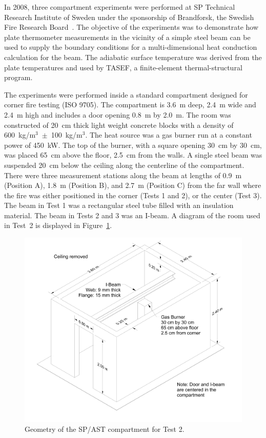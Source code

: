 In 2008, three compartment experiments were performed at SP Technical Research Institute of Sweden under the sponsorship of Brandforsk, the Swedish Fire Research Board~\cite{Wickstrom_AST}. The objective of the experiments was to demonstrate how plate thermometer measurements in the vicinity of a simple steel beam can be used to supply the boundary conditions for a multi-dimensional heat conduction calculation for the beam. The adiabatic surface temperature was derived from the plate temperatures and used by TASEF, a finite-element
thermal-structural program.

The experiments were performed inside a standard compartment designed for corner fire testing (ISO 9705). The compartment is 3.6~m deep, 2.4~m wide and 2.4~m high and includes a door opening 0.8~m by 2.0~m. The room was constructed of 20~cm thick light weight concrete blocks with a density of 600~kg/m$^3$~$\pm$~100~kg/m$^3$. The heat source was a gas burner run at a constant power of 450~kW. The top of the burner, with a square opening 30~cm by 30~cm, was placed 65~cm above the floor, 2.5~cm from the walls. A single steel beam was suspended 20~cm below the ceiling along the centerline of the compartment. There were three measurement stations along the beam at lengths of 0.9~m (Position A), 1.8~m (Position B), and 2.7~m (Position C) from the far wall where the fire was either positioned in the corner (Tests 1 and 2), or the center (Test 3). The beam in Test 1 was a rectangular steel tube filled with an insulation material. The beam in Tests 2 and 3 was an I-beam.  A diagram of the room used in Test~2 is displayed in Figure~\ref{Room_Drawing}.

\begin{figure}[ht]
\includegraphics[width=\textwidth]{FIGURES/SP_AST/SP_AST_Compartment_Drawing.png}
\caption{Geometry of the  SP/AST compartment for Test 2.}
\label{Room_Drawing}
\end{figure}

